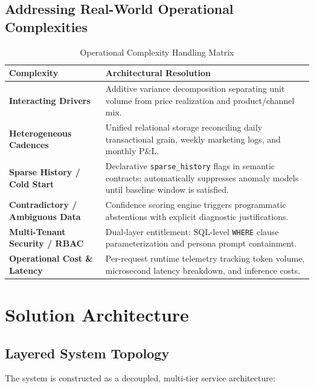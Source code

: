 \documentclass[11pt,a4paper]{article}
\begin{document}
\subsection{Addressing Real-World Operational Complexities}
\begin{table}[h!]
\centering
\small
\begin{tabularx}{\textwidth}{lX}
\toprule
\textbf{Complexity} & \textbf{Architectural Resolution} \\
\midrule
\textbf{Interacting Drivers} & Additive variance decomposition separating unit volume from price realization and product/channel mix. \\
\textbf{Heterogeneous Cadences} & Unified relational storage reconciling daily transactional grain, weekly marketing logs, and monthly P\&L. \\
\textbf{Sparse History / Cold Start} & Declarative \texttt{sparse\_history} flags in semantic contracts; automatically suppresses anomaly models until baseline window is satisfied. \\
\textbf{Contradictory / Ambiguous Data} & Confidence scoring engine triggers programmatic abstentions with explicit diagnostic justifications. \\
\textbf{Multi-Tenant Security / RBAC} & Dual-layer entitlement: SQL-level \texttt{WHERE} clause parameterization and persona prompt containment. \\
\textbf{Operational Cost \& Latency} & Per-request runtime telemetry tracking token volume, microsecond latency breakdown, and inference costs. \\
\bottomrule
\end{tabularx}
\caption{Operational Complexity Handling Matrix}
\end{table}

\newpage
\section{Solution Architecture}

\subsection{Layered System Topology}
The system is constructed as a decoupled, multi-tier service architecture:
\end{document}
